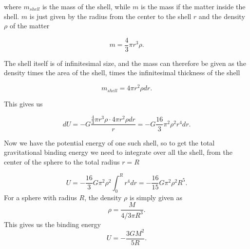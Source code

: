 \documentclass[a4paper,norsk, 10pt]{article}
\begin{document}
where $m_{shell}$ is the mass of the shell, while $m$ is the mass if the matter inside the shell. $m$ is just given by the radius from the center to the shell $r$ and the density $\rho$ of the matter


\begin{equation}
m = \frac{4}{3}\pi r^3 \rho.
\end{equation}

The shell itself is of infinitesimal size, and the mass can therefore be given as the density times the area of the shell, times the infinitesimal thickness of the shell

\begin{equation}
m_{shell} = 4\pi r^2\rho dr.
\end{equation}

This gives us 

\begin{equation}
dU = - G\frac{\frac{4}{3}\pi r^3 \rho\cdot 4\pi r^2\rho dr}{r} = -G\frac{16}{3}\pi^2\rho^2 r^4 dr.
\end{equation}


Now we have the potential energy of one such shell, so to get the total gravitational binding energy we need to integrate over all the shell, from the center of the sphere to the total radius $r=R$

\begin{equation}
U = -\frac{16}{3}G\pi^2\rho^2 \int_0^R r^4 dr = -\frac{16}{15}G\pi^2\rho^2 R^5.
\end{equation}
For a sphere with radius $R$, the density $\rho$ is simply given as
\begin{equation}
\rho = \frac{M}{4/3 \pi R^3}.
\end{equation}
This gives us the binding energy
\begin{equation}
U = -\frac{3GM^2}{5R}.
\end{equation}
\end{document}
